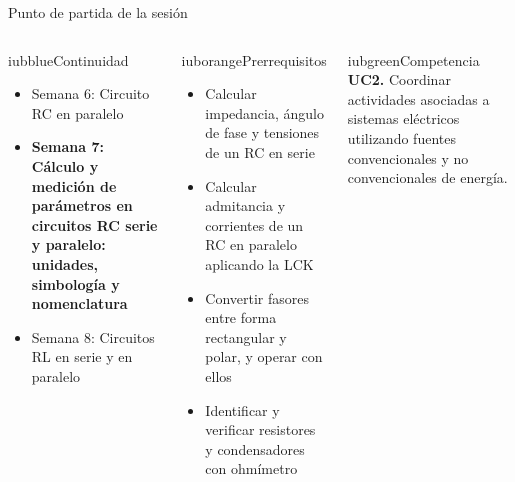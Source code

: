 \documentclass[aspectratio=169,11pt,xcolor={table}]{beamer}
\begin{document}
\begin{frame}{Punto de partida de la sesión}
\begin{columns}[T,onlytextwidth]
\begin{caja}[height=5.9cm]{iubblue}{Continuidad}
\scriptsize \begin{itemize}\setlength{\itemsep}{2pt}
  \item Semana 6: Circuito RC en paralelo
  \item \textbf{Semana 7: Cálculo y medición de parámetros en circuitos RC serie y paralelo: unidades, simbología y nomenclatura}
  \item Semana 8: Circuitos RL en serie y en paralelo
\end{itemize}
\end{caja}
\begin{caja}[height=5.9cm]{iuborange}{Prerrequisitos}
\scriptsize \begin{itemize}\setlength{\itemsep}{2pt}
  \item Calcular impedancia, ángulo de fase y tensiones de un RC en serie
  \item Calcular admitancia y corrientes de un RC en paralelo aplicando la LCK
  \item Convertir fasores entre forma rectangular y polar, y operar con ellos
  \item Identificar y verificar resistores y condensadores con ohmímetro
\end{itemize}
\end{caja}
\begin{caja}[height=5.9cm]{iubgreen}{Competencia}
\scriptsize \textbf{UC2.} Coordinar actividades asociadas a sistemas eléctricos utilizando fuentes convencionales y no convencionales de energía.
\end{caja}
\end{columns}
\end{frame}
\end{document}
